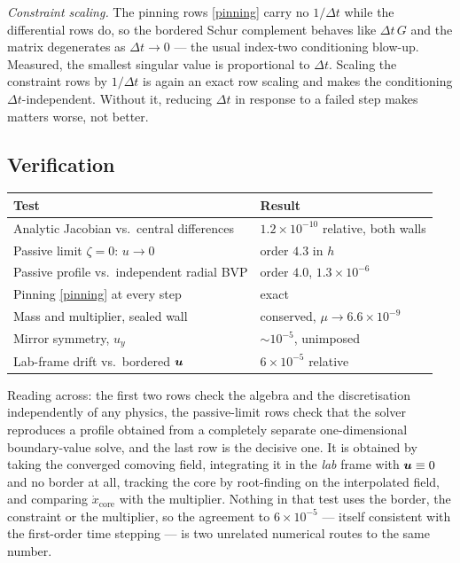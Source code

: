 \documentclass[a5paper]{article}
\begin{document}
\emph{Constraint scaling.} The pinning rows \eqref{pinning} carry no $1/\Delta t$ while the differential rows do, so the bordered Schur complement behaves like $\Delta t\, G$ and the matrix degenerates as $\Delta t \to 0$ --- the usual index-two conditioning blow-up. Measured, the smallest singular value is proportional to $\Delta t$. Scaling the constraint rows by $1/\Delta t$ is again an exact row scaling and makes the conditioning $\Delta t$-independent. Without it, reducing $\Delta t$ in response to a failed step makes matters worse, not better.

\subsection{Verification}
\label{sec-comoving-verification}

\begin{center}
\footnotesize
\begin{tabular}{|l|l|}
    \hline Test & Result \\ \hline
    Analytic Jacobian vs.\ central differences & $1.2 \times 10^{-10}$ relative, both walls \\ \hline
    Passive limit $\zeta = 0$: $u \to 0$ & order $4.3$ in $h$ \\ \hline
    Passive profile vs.\ independent radial BVP & order $4.0$, $1.3\times10^{-6}$ \\ \hline
    Pinning \eqref{pinning} at every step & exact \\ \hline
    Mass and multiplier, sealed wall & conserved, $\mu \to 6.6\times10^{-9}$ \\ \hline
    Mirror symmetry, $u_y$ & $\sim 10^{-5}$, unimposed \\ \hline
    Lab-frame drift vs.\ bordered $\boldsymbol{u}$ & $6 \times 10^{-5}$ relative \\ \hline
\end{tabular}
\end{center}

Reading across: the first two rows check the algebra and the discretisation independently of any physics, the passive-limit rows check that the solver reproduces a profile obtained from a completely separate one-dimensional boundary-value solve, and the last row is the decisive one. It is obtained by taking the converged comoving field, integrating it in the \emph{lab} frame with $\boldsymbol{u} \equiv 0$ and no border at all, tracking the core by root-finding on the interpolated field, and comparing $\dot x_\text{core}$ with the multiplier. Nothing in that test uses the border, the constraint or the multiplier, so the agreement to $6\times10^{-5}$ --- itself consistent with the first-order time stepping --- is two unrelated numerical routes to the same number.
\end{document}
